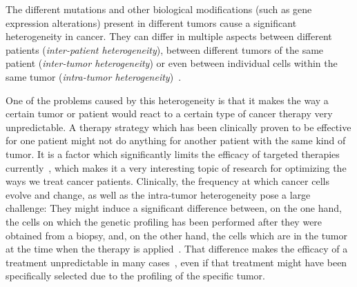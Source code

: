 
The different mutations and other biological modifications (such as gene expression alterations) present in different tumors cause a significant heterogeneity in cancer. They can differ in multiple aspects between different patients (\textit{inter-patient heterogeneity}), between different tumors of the same patient (\textit{inter-tumor heterogeneity}) or even between individual cells within the same tumor (\textit{intra-tumor heterogeneity})~\cite{heterogeneity-implications-targeted-therapeutics}.

One of the problems caused by this heterogeneity is that it makes the way a certain tumor or patient would react to a certain type of cancer therapy very unpredictable. A therapy strategy which has been clinically proven to be effective for one patient might not do anything for another patient with the same kind of tumor. It is a factor which significantly limits the efficacy of targeted therapies currently~\cite{heterogeneity-is-it-a-problem}, which makes it a very interesting topic of research for optimizing the ways we treat cancer patients. Clinically, the frequency at which cancer cells evolve and change, as well as the intra-tumor heterogeneity pose a large challenge: They might induce a significant difference between, on the one hand, the cells on which the genetic profiling has been performed after they were obtained from a biopsy, and, on the other hand, the cells which are in the tumor at the time when the therapy is applied~\cite{heterogeneity-is-it-a-problem}. That difference makes the efficacy of a treatment unpredictable in many cases~\cite{narrative-review-heterogeneity-challenges}, even if that treatment might have been specifically selected due to the profiling of the specific tumor.


